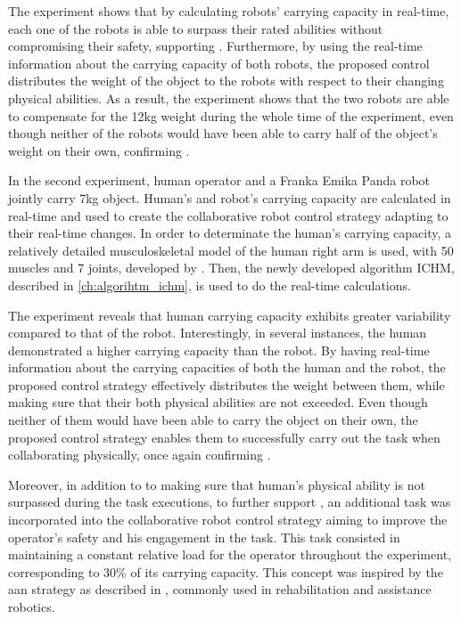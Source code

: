 The experiment shows that by calculating robots' carrying capacity in real-time, each one of the robots is able to surpass their rated abilities without compromising their safety, supporting .
Furthermore, by using the real-time information about the carrying capacity of both robots, the proposed control distributes the weight of the object to the robots with respect to their changing physical abilities. As a result, the experiment shows that the two robots are able to compensate for the 12kg weight during the whole time of the experiment, even though neither of the robots would have been able to carry half of the object's weight on their own, confirming .

In the second experiment, human operator and a Franka Emika Panda robot jointly carry 7kg object. Human's and robot's carrying capacity are calculated in real-time and used to create the collaborative robot control strategy adapting to their real-time changes.
In order to determinate the human's carrying capacity, a relatively detailed musculoskeletal model of the human right arm is used, with 50 muscles and 7 joints, developed by \citet{holzbaur2005model}. Then, the newly developed algorithm ICHM, described in \ref{ch:algorihtm_ichm}, is used to do the real-time calculations.

The experiment reveals that human carrying capacity exhibits greater variability compared to that of the robot. Interestingly, in several instances, the human demonstrated a higher carrying capacity than the robot. 
By having real-time information about the carrying capacities of both the human and the robot, the proposed control strategy effectively distributes the weight between them, while making sure that their both physical abilities are not exceeded. Even though neither of them would have been able to carry the object on their own, the proposed control strategy enables them to successfully carry out the task when collaborating physically, once again confirming . 

Moreover, in addition to to making sure that human's physical ability is not surpassed during the task executions, to further support , an additional task was incorporated into the collaborative robot control strategy aiming to improve the operator's safety and his engagement in the task. This task consisted in maintaining a constant relative load for the operator throughout the experiment, corresponding to 30\% of its carrying capacity. This concept was inspired by the \gls{aan} strategy as described in \citet{carmichael2013admittance}, commonly used in rehabilitation and assistance robotics. 

